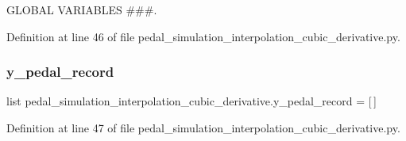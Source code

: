 G\+L\+O\+B\+AL V\+A\+R\+I\+A\+B\+L\+ES \#\#\#. 



Definition at line 46 of file pedal\+\_\+simulation\+\_\+interpolation\+\_\+cubic\+\_\+derivative.\+py.

\mbox{\label{namespacepedal__simulation__interpolation__cubic__derivative_a237b936a014f1444eea759e6081f5d4f}} 
\subsubsection{\texorpdfstring{y\_pedal\_record}{y\_pedal\_record}}
{\footnotesize\ttfamily list pedal\+\_\+simulation\+\_\+interpolation\+\_\+cubic\+\_\+derivative.\+y\+\_\+pedal\+\_\+record = \mbox{[}$\,$\mbox{]}}



Definition at line 47 of file pedal\+\_\+simulation\+\_\+interpolation\+\_\+cubic\+\_\+derivative.\+py.

